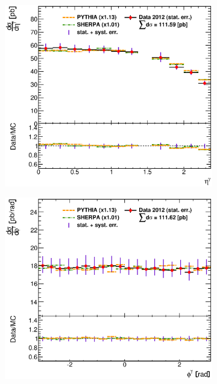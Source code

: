 \documentclass[12pt, twoside]{article}
\numberwithin{equation}{section}
\numberwithin{figure}{section}
\newenvironment{changemargin}[2]{%
\begin{list}{}{%
\setlength{\topsep}{0pt}%
\setlength{\leftmargin}{#1}%
\setlength{\rightmargin}{#2}%
\setlength{\listparindent}{\parindent}%
\setlength{\itemindent}{\parindent}%
\setlength{\parsep}{\parskip}%
}%
\item[]}{\end{list}}
\begin{document}
\begin{figure}
\begin{changemargin}{-1.0cm}{-0.75cm}
\begin{changemargin}{-0.75cm}{-1.0cm}
\begin{subfigure}[b]{0.37\textwidth}
            \includegraphics[width=\textwidth]{./images/DifferentialCrossSections/DIFF_CRSS_SEC-102.eps}
            \subcaption{}
            \label{fig:DiffCrossSectEtaPhoton}
        \end{subfigure}
        \begin{subfigure}[b]{0.37\textwidth}
            \includegraphics[width=\textwidth]{./images/DifferentialCrossSections/DIFF_CRSS_SEC-103.eps}
            \subcaption{}
            \label{fig:DiffCrossSectPhiPhoton}
        \end{subfigure}


\end{changemargin}
\end{changemargin}
\end{figure}
\end{document}
